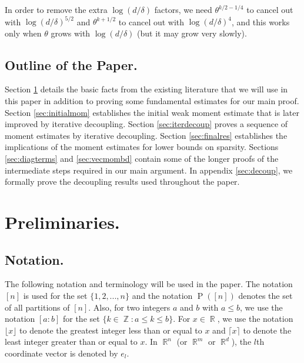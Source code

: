 \documentclass[11pt]{amsart}
\numberwithin{equation}{section}
\numberwithin{equation}{section}
\DeclareMathOperator{\R}{\mathbb{R}}
\DeclareMathOperator{\Z}{\mathbb{Z}}
\begin{document}
In order to remove the extra $\log(d/\delta)$ factors, we need $\theta ^{k/2-1/4}$ to cancel out with $\log(d/\delta)^{5/2}$ and $\theta ^{k+1/2}$ to cancel out with $ \log(d/\delta)^{4}$, and this works only when $\theta$ grows with $\log(d/\delta)$ (but it may grow very slowly).



\subsection{Outline of the Paper.}
Section \ref{sec:prelim} details the basic facts from the existing literature that we will use in this paper in addition to proving some fundamental estimates for our main proof. Section \ref{sec:initialmom} establishes the initial weak moment estimate that is later improved by iterative decoupling. Section \ref{sec:iterdecoup} proves a sequence of moment estimates by iterative decoupling. Section \ref{sec:finalres} establishes the implications of the moment estimates for lower bounds on sparsity. Sections \ref{sec:diagterms} and \ref{sec:vecmombd} contain some of the longer proofs of the intermediate steps required in our main argument. In appendix \ref{sec:decoup}, we formally prove the decoupling results used throughout the paper. 






\section{Preliminaries.} \label{sec:prelim}

\subsection{Notation.} \label{subsec:notation}
The following notation and terminology will be used in the paper. The notation $[n]$ is used for the set $\{1,2,...,n\}$ and the notation $\operatorname{P}([n])$ denotes the set of all partitions of $[n]$. Also, for two integers $a$ and $b$ with $a \le b$, we use the notation $[a:b]$ for the set $\{k \in \Z:a \le k \le b\}$. For $x \in \R$, we use the notation $\lfloor x \rfloor$ to denote the greatest integer less than or equal to $x$ and $\lceil x \rceil$ to denote the least integer greater than or equal to  $x$. In $\R^n$ (or $\R^m$ or $\R^d$), the $l$th coordinate vector is denoted by $e_l$. 
\end{document}
